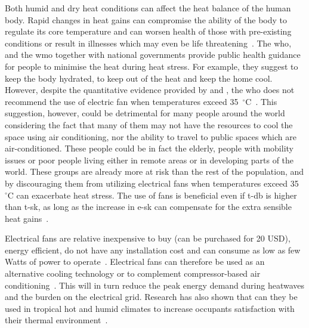 Both humid and dry heat conditions can affect the heat balance of the human body.
Rapid changes in heat gains can compromise the ability of the body to regulate its core temperature and can worsen health of those with pre-existing conditions or result in illnesses which may even be life threatening~\cite{WMO2015}.
The \ac{who}, and the \ac{wmo} together with national governments provide public health guidance for people to minimise the heat during heat stress.
For example, they suggest to keep the body hydrated, to keep out of the heat and keep the home cool.
However, despite the quantitative evidence provided by  and , the \ac{who} does not recommend the use of electric fan when temperatures exceed 35~$^{\circ}$C~\cite{HeatandH28:online, WMO2015}.
This suggestion, however, could be detrimental for many people around the world considering the fact that many of them may not have the resources to cool the space using air conditioning, nor the ability to travel to public spaces which are air-conditioned.
These people could be in fact the elderly, people with mobility issues or poor people living either in remote areas or in developing parts of the world.
These groups are already more at risk than the rest of the population, and by discouraging them from utilizing electrical fans when temperatures exceed 35~$^{\circ}$C can exacerbate heat stress.
The use of fans is beneficial even if \ac{t-db} is higher than \ac{t-sk}, as long as the increase in \ac{e-sk} can compensate for the extra sensible heat gains~\cite{Jay2015}.

Electrical fans are relative inexpensive to buy (can be purchased for 20 USD), energy efficient, do not have any installation cost and can consume as low as few Watts of power to operate~\cite{Yang2015a, Lipczynska2018a, Jay2019a}.
Electrical fans can therefore be used as an alternative cooling technology or to complement compressor-based air conditioning~\cite{Yang2015a, Lipczynska2018a, Jay2019a}.
This will in turn reduce the peak energy demand during heatwaves and the burden on the electrical grid.
Research has also shown that can they be used in tropical hot and humid climates to increase occupants satisfaction with their thermal environment~\cite{Lipczynska2018a}.

